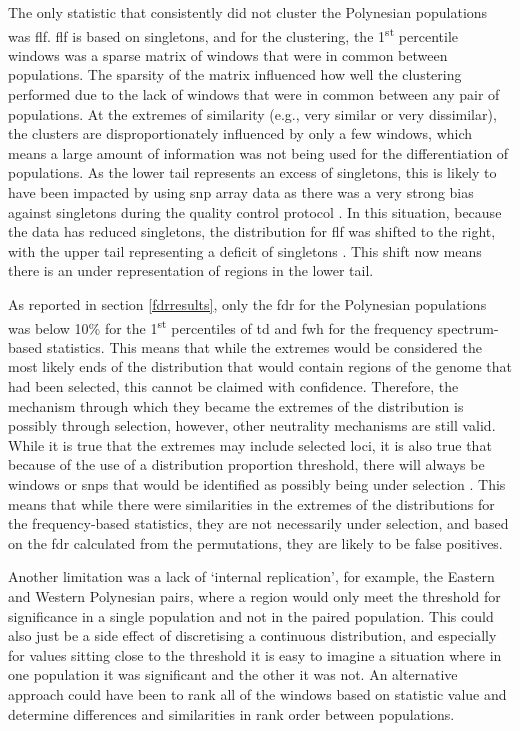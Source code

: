 \documentclass[twoside,openright]{report}
\begin{document}
The only statistic that consistently did not cluster the Polynesian
populations was \gls{flf}. \Gls{flf} is based on singletons, and for the
clustering, the 1\textsuperscript{st} percentile windows was a sparse
matrix of windows that were in common between populations. The sparsity
of the matrix influenced how well the clustering performed due to the
lack of windows that were in common between any pair of populations. At
the extremes of similarity (e.g., very similar or very dissimilar), the
clusters are disproportionately influenced by only a few windows, which
means a large amount of information was not being used for the
differentiation of populations. As the lower tail represents an excess
of singletons, this is likely to have been impacted by using \gls{snp}
array data as there was a very strong bias against singletons during the
quality control protocol \citep{Guo2014}. In this situation, because the
data has reduced singletons, the distribution for \gls{flf} was shifted
to the right, with the upper tail representing a deficit of singletons
\citep{Fu1993}. This shift now means there is an under representation of
regions in the lower tail.

As reported in section \ref{fdrresults}, only the \gls{fdr} for the
Polynesian populations was below 10\% for the 1\textsuperscript{st}
percentiles of \gls{td} and \gls{fwh} for the frequency spectrum-based
statistics. This means that while the extremes would be considered the
most likely ends of the distribution that would contain regions of the
genome that had been selected, this cannot be claimed with confidence.
Therefore, the mechanism through which they became the extremes of the
distribution is possibly through selection, however, other neutrality
mechanisms are still valid. While it is true that the extremes may
include selected loci, it is also true that because of the use of a
distribution proportion threshold, there will always be windows or
\glspl{snp} that would be identified as possibly being under selection
\citep{Teshima2006}. This means that while there were similarities in
the extremes of the distributions for the frequency-based statistics,
they are not necessarily under selection, and based on the \gls{fdr}
calculated from the permutations, they are likely to be false positives.

Another limitation was a lack of `internal replication', for example,
the Eastern and Western Polynesian pairs, where a region would only meet
the threshold for significance in a single population and not in the
paired population. This could also just be a side effect of discretising
a continuous distribution, and especially for values sitting close to
the threshold it is easy to imagine a situation where in one population
it was significant and the other it was not. An alternative approach
could have been to rank all of the windows based on statistic value and
determine differences and similarities in rank order between
populations.
\end{document}

